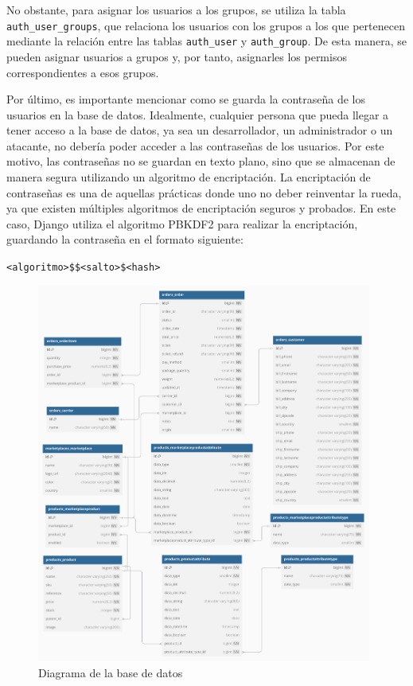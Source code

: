 No obstante, para asignar los usuarios a los grupos, se utiliza la tabla \texttt{auth\_user\_groups}, que relaciona los usuarios con los grupos a los que pertenecen mediante la relación entre las tablas \texttt{auth\_user} y \texttt{auth\_group}. De esta manera, se pueden asignar usuarios a grupos y, por tanto, asignarles los permisos correspondientes a esos grupos.

Por último, es importante mencionar como se guarda la contraseña de los usuarios en la base de datos. Idealmente, cualquier persona que pueda llegar a tener acceso a la base de datos, ya sea un desarrollador, un administrador o un atacante, no debería poder acceder a las contraseñas de los usuarios. Por este motivo, las contraseñas no se guardan en texto plano, sino que se almacenan de manera segura utilizando un algoritmo de encriptación. La encriptación de contraseñas es una de aquellas prácticas donde uno no deber reinventar la rueda, ya que existen múltiples algoritmos de encriptación seguros y probados. En este caso, Django utiliza el algoritmo PBKDF2 para realizar la encriptación, guardando la contraseña en el formato siguiente:

\begin{center}
    \texttt{<algoritmo>\$<número de iteraciones>\$<salto>\$<hash>}
\end{center}



\begin{figure}
    \centering
    \includegraphics[width=0.98\textwidth]{figures/design_develop/database_diagram.pdf}
    \caption{Diagrama de la base de datos}
    \label{fig:diagrama_base_datos}
\end{figure}